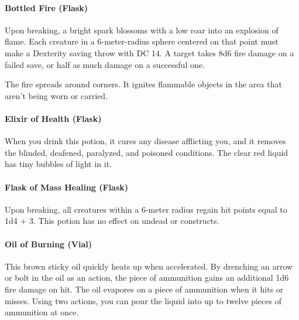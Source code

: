 \paragraph{Bottled Fire (Flask)} %
    Upon breaking, a bright spark blossoms with a low roar into an explosion of flame.
    Each creature in a 6-meter-radius sphere centered on that point must make a Dexterity saving throw with DC 14.
    A target takes 8d6 fire damage on a failed save, or half as much damage on a successful one.

    The fire spreads around corners.
    It ignites flammable objects in the area that aren't being worn or carried.
\paragraph{Elixir of Health (Flask)}
    When you drink this potion, it cures any disease afflicting you, and it removes the blinded, deafened, paralyzed, and poisoned conditions.
    The clear red liquid has tiny bubbles of light in it.
\paragraph{Flask of Mass Healing (Flask)} %
    Upon breaking, all creatures within a 6-meter radius regain hit points equal to 1d4 + 3.
    This potion has no effect on undead or constructs.
\paragraph{Oil of Burning (Vial)} %
    This brown sticky oil quickly heats up when accelerated.
    By drenching an arrow or bolt in the oil as an action, the piece of ammunition gains an additional 1d6 fire damage on hit.
    The oil evapores on a piece of ammunition when it hits or misses.
    Using two actions, you can pour the liquid into up to twelve pieces of ammunition at once.
